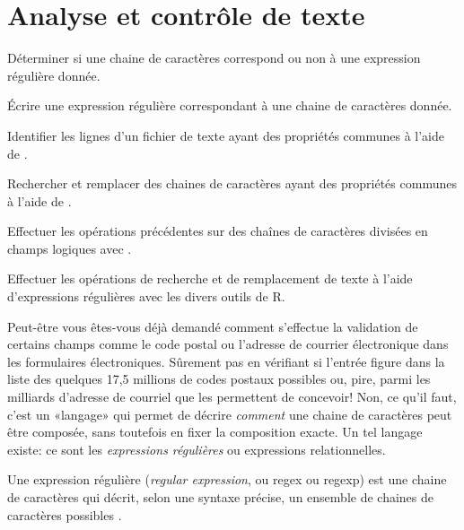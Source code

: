 
\chapter{Analyse et contrôle de texte}
\label{chap:texte}

\begin{objectifs}
\item Déterminer si une chaine de caractères correspond ou non à une
  expression régulière donnée.
\item Écrire une expression régulière correspondant à une chaine de
  caractères donnée.
\item Identifier les lignes d'un fichier de texte ayant des propriétés
  communes à l'aide de .
\item Rechercher et remplacer des chaines de caractères ayant des
  propriétés communes à l'aide de .
\item Effectuer les opérations précédentes sur des chaînes de
  caractères divisées en champs logiques avec .
\item Effectuer les opérations de recherche et de remplacement de
  texte à l'aide d'expressions régulières avec les divers outils de R.
\end{objectifs}


Peut-être vous êtes-vous déjà demandé comment s'effectue la validation
de certains champs comme le code postal ou l'adresse de courrier
électronique dans les formulaires électroniques. Sûrement pas en
vérifiant si l'entrée figure dans la liste des quelques 17,5 millions
de codes postaux possibles ou, pire, parmi les milliards d'adresse de
courriel que les  permettent de concevoir! Non, ce qu'il faut, c'est
un «langage» qui permet de décrire \emph{comment} une chaine de
caractères peut être composée, sans toutefois en fixer la composition
exacte. Un tel langage existe: ce sont les \emph{expressions
  régulières} ou expressions relationnelles.

Une expression régulière (\emph{regular expression}, ou regex ou
regexp) est une chaine de caractères qui décrit, selon une syntaxe
précise, un ensemble de chaines de caractères possibles
\citep{Wikipedia:Expression_reguliere}.

